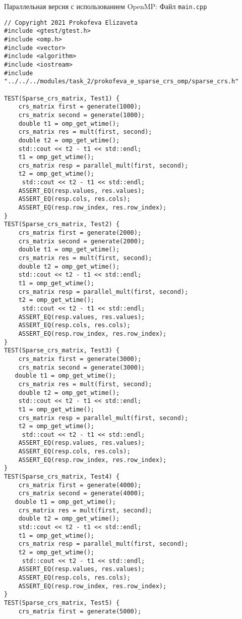 \documentclass{report}
\begin{document}
Параллельная версия с использованием OpenMP:
\newline Файл \verb|main.cpp|
\begin{lstlisting}
// Copyright 2021 Prokofeva Elizaveta
#include <gtest/gtest.h>
#include <omp.h>
#include <vector>
#include <algorithm>
#include <iostream>
#include "../../../modules/task_2/prokofeva_e_sparse_crs_omp/sparse_crs.h"

TEST(Sparse_crs_matrix, Test1) {
    crs_matrix first = generate(1000);
    crs_matrix second = generate(1000);
    double t1 = omp_get_wtime();
    crs_matrix res = mult(first, second);
    double t2 = omp_get_wtime();
    std::cout << t2 - t1 << std::endl;
    t1 = omp_get_wtime();
    crs_matrix resp = parallel_mult(first, second);
    t2 = omp_get_wtime();
     std::cout << t2 - t1 << std::endl;
    ASSERT_EQ(resp.values, res.values);
    ASSERT_EQ(resp.cols, res.cols);
    ASSERT_EQ(resp.row_index, res.row_index);
}
TEST(Sparse_crs_matrix, Test2) {
    crs_matrix first = generate(2000);
    crs_matrix second = generate(2000);
    double t1 = omp_get_wtime();
    crs_matrix res = mult(first, second);
    double t2 = omp_get_wtime();
    std::cout << t2 - t1 << std::endl;
    t1 = omp_get_wtime();
    crs_matrix resp = parallel_mult(first, second);
    t2 = omp_get_wtime();
     std::cout << t2 - t1 << std::endl;
    ASSERT_EQ(resp.values, res.values);
    ASSERT_EQ(resp.cols, res.cols);
    ASSERT_EQ(resp.row_index, res.row_index);
}
TEST(Sparse_crs_matrix, Test3) {
    crs_matrix first = generate(3000);
    crs_matrix second = generate(3000);
   double t1 = omp_get_wtime();
    crs_matrix res = mult(first, second);
    double t2 = omp_get_wtime();
    std::cout << t2 - t1 << std::endl;
    t1 = omp_get_wtime();
    crs_matrix resp = parallel_mult(first, second);
    t2 = omp_get_wtime();
     std::cout << t2 - t1 << std::endl;
    ASSERT_EQ(resp.values, res.values);
    ASSERT_EQ(resp.cols, res.cols);
    ASSERT_EQ(resp.row_index, res.row_index);
}
TEST(Sparse_crs_matrix, Test4) {
    crs_matrix first = generate(4000);
    crs_matrix second = generate(4000);
   double t1 = omp_get_wtime();
    crs_matrix res = mult(first, second);
    double t2 = omp_get_wtime();
    std::cout << t2 - t1 << std::endl;
    t1 = omp_get_wtime();
    crs_matrix resp = parallel_mult(first, second);
    t2 = omp_get_wtime();
     std::cout << t2 - t1 << std::endl;
    ASSERT_EQ(resp.values, res.values);
    ASSERT_EQ(resp.cols, res.cols);
    ASSERT_EQ(resp.row_index, res.row_index);
}
TEST(Sparse_crs_matrix, Test5) {
    crs_matrix first = generate(5000);

\end{lstlisting}
\end{document}
